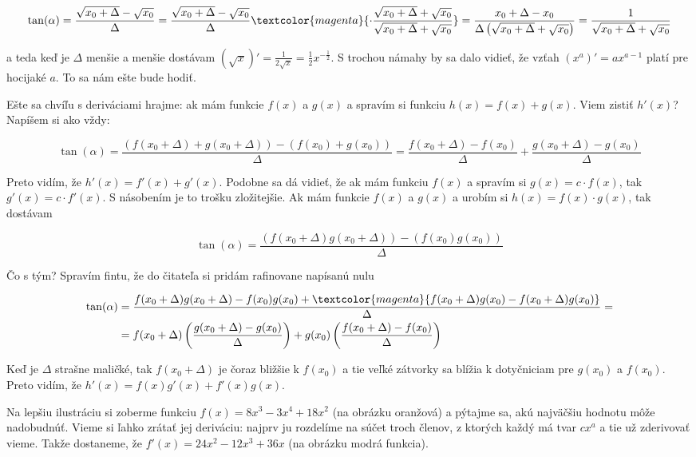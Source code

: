 $$\tan(\alpha)=\frac{\sqrt{x_0+\Delta}-\sqrt{x_0}}{\Delta} = \frac{\sqrt{x_0+\Delta}-\sqrt{x_0}}{\Delta}
\textcolor{magenta}{\cdot\frac{\sqrt{x_0+\Delta}+\sqrt{x_0}}{\sqrt{x_0+\Delta}+\sqrt{x_0}}}=
\frac{x_0+\Delta-x_0}{\Delta\left(\sqrt{x_0+\Delta}+\sqrt{x_0}\right)}=
\frac{1}{\sqrt{x_0+\Delta}+\sqrt{x_0}}
$$

a teda keď je $\Delta$ menšie a menšie dostávam 
$\left(\sqrt{x}\right)'=\frac{1}{2\sqrt{x}}=\frac{1}{2}x^{-\frac{1}{2}}$. 
S trochou námahy by sa dalo vidieť, že vzťah $\left(x^a\right)'=ax^{a-1}$
platí pre hocijaké $a$. To sa nám ešte bude hodiť.

Ešte sa chvíľu s deriváciami hrajme: ak mám funkcie $f(x)$ a $g(x)$ a spravím si funkciu $h(x)=f(x)+g(x)$. Viem zistiť $h'(x)$? Napíšem si ako vždy:

$$\tan(\alpha)=\frac{\left(f(x_0+\Delta)+g(x_0+\Delta)\right)-\left(f(x_0)+g(x_0)\right)}{\Delta}=\frac{f(x_0+\Delta)-f(x_0)}{\Delta}+\frac{g(x_0+\Delta)-g(x_0)}{\Delta}$$

Preto vidím, že $h'(x)=f'(x)+g'(x)$. Podobne sa dá vidieť, že ak mám funkciu $f(x)$ a spravím si 
\hbox{$g(x)=c\cdot f(x)$,} tak $g'(x)=c\cdot f'(x)$. S násobením je to trošku 
zložitejšie. Ak mám funkcie $f(x)$ a $g(x)$ a urobím si $h(x)=f(x)\cdot g(x)$, tak dostávam

$$\tan(\alpha)=\frac{\left(f(x_0+\Delta)g(x_0+\Delta)\right)-\left(f(x_0)g(x_0)\right)}{\Delta}
$$

Čo s tým? Spravím fintu, že do čitateľa si pridám rafinovane napísanú nulu

\begin{align*}
  \tan(\alpha)&=\frac{f(x_0+\Delta)g(x_0+\Delta)-f(x_0)g(x_0)+\textcolor{magenta}{f(x_0+\Delta)g(x_0)-f(x_0+\Delta)g(x_0) }}{\Delta}=\\
  &=f(x_0+\Delta)\left(\frac{g(x_0+\Delta)-g(x_0)}{\Delta}\right)+g(x_0)\left(\frac{f(x_0+\Delta)-f(x_0)}{\Delta}\right)
\end{align*}

Keď je $\Delta$ strašne maličké, tak $f(x_0+\Delta)$ je čoraz bližšie k $f(x_0)$ a tie veľké zátvorky sa blížia k dotyčniciam pre $g(x_0)$ a $f(x_0)$. Preto vidím, že
$h'(x)=f(x)g'(x)+f'(x)g(x)$.

Na lepšiu ilustráciu si zoberme funkciu $f(x)= 8x^3-3x^4+18x^2$ (na obrázku oranžová) a pýtajme sa,
akú najväčšiu hodnotu môže nadobudnúť. Vieme si ľahko zrátať jej deriváciu: najprv ju rozdelíme na
súčet troch členov, z ktorých každý má tvar $cx^a$ a tie už zderivovať vieme. Takže dostaneme,
že $f'(x)=24x^2-12x^3+36x$ (na obrázku modrá funkcia).

